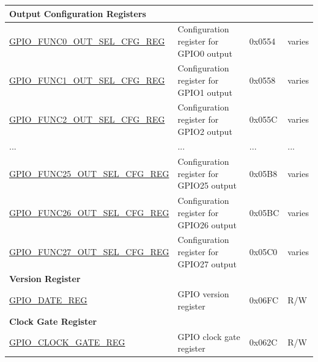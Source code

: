 \begin{longtable}{ | p{5.8cm} | p{7.2cm} | p{1.3cm} | p{2cm} | }
\multicolumn{4}{|l|}{\textbf{Output Configuration Registers}} \\ \hline
\hyperref[regdesc:GPIOFUNCNOUTSELCFGREG]{GPIO\_FUNC0\_OUT\_SEL\_CFG\_REG} & Configuration register for GPIO0 output & 0x0554 & varies \\ \hline
\hyperref[regdesc:GPIOFUNCNOUTSELCFGREG]{GPIO\_FUNC1\_OUT\_SEL\_CFG\_REG} & Configuration register for GPIO1 output & 0x0558 & varies \\ \hline
\hyperref[regdesc:GPIOFUNCNOUTSELCFGREG]{GPIO\_FUNC2\_OUT\_SEL\_CFG\_REG} & Configuration register for GPIO2 output & 0x055C & varies \\ \hline
...& ... & ... & ... \\ \hline
\hyperref[regdesc:GPIOFUNCNOUTSELCFGREG]{GPIO\_FUNC25\_OUT\_SEL\_CFG\_REG} & Configuration register for GPIO25 output & 0x05B8 & varies \\ \hline
\hyperref[regdesc:GPIOFUNCNOUTSELCFGREG]{GPIO\_FUNC26\_OUT\_SEL\_CFG\_REG} & Configuration register for GPIO26 output & 0x05BC & varies \\ \hline
\hyperref[regdesc:GPIOFUNCNOUTSELCFGREG]{GPIO\_FUNC27\_OUT\_SEL\_CFG\_REG} & Configuration register for GPIO27 output & 0x05C0 & varies \\ \hline

\multicolumn{4}{|l|}{\textbf{Version Register}} \\ \hline
\hyperref[regdesc:GPIOREGDATEREG]{GPIO\_DATE\_REG} & GPIO version register & 0x06FC & R/W \\ \hline

\multicolumn{4}{|l|}{\textbf{Clock Gate Register}} \\ \hline
\hyperref[regdesc:GPIOCLOCKGATEREG]{GPIO\_CLOCK\_GATE\_REG} & GPIO clock gate register & 0x062C & R/W \\ \hline
\end{longtable}

